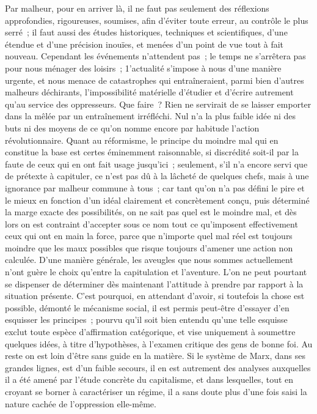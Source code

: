 \documentclass[french,twoside]{book} %
\begin{document}
Par malheur, pour en arriver là, il ne faut pas seulement des réflexions approfondies, rigoureuses, soumises, afin d'éviter toute erreur, au contrôle le plus serré ; il faut aussi des études historiques, techniques et scientifiques, d'une étendue et d'une précision inouïes, et menées d'un point de vue tout à fait nouveau. Cependant les événements n'attendent pas ; le temps ne s'arrêtera pas pour nous ménager des loisirs ; 1'actualité s'impose à nous d'une manière urgente, et nous menace de catastrophes qui entraîneraient, parmi bien d'autres malheurs déchirants, l'impossibilité matérielle d'étudier et d'écrire autrement qu'au service des oppresseurs. Que faire ? Rien ne servirait de se laisser emporter dans la mêlée par un entraînement irréfléchi. Nul n'a la plus faible idée ni des buts ni des moyens de ce qu'on nomme encore par habitude l'action révolutionnaire. Quant au réformisme, le principe du moindre mal qui en constitue la base est certes éminemment raisonnable, si discrédité soit-il par la faute de ceux qui en ont fait usage jusqu'ici ; seulement, s'il n'a encore servi que de prétexte à capituler, ce n'est pas dû à la lâcheté de quelques chefs, mais à une ignorance par malheur commune à tous ; car tant qu'on n'a pas défini le pire et le mieux en fonction d'un idéal clairement et concrètement conçu, puis déterminé la marge exacte des possibilités, on ne sait pas quel est le moindre mal, et dès lors on est contraint d'accepter sous ce nom tout ce qu'imposent effectivement ceux qui ont en main la force, parce que n'importe quel mal réel est toujours moindre que les maux possibles que risque toujours d'amener une action non calculée. D'une manière générale, les aveugles que nous sommes actuellement n'ont guère le choix qu'entre la capitulation et l'aventure. L'on ne peut pourtant se dispenser de déterminer dès maintenant l'attitude à prendre par rapport à la situation présente. C'est pourquoi, en attendant d'avoir, si toutefois la chose est possible, démonté le mécanisme social, il est permis peut-être d'essayer d'en esquisser les principes ; pourvu qu'il soit bien entendu qu'une telle esquisse exclut toute espèce d'affirmation catégorique, et vise uniquement à soumettre quelques idées, à titre d'hypothèses, à l'examen critique des gens de bonne foi. Au reste on est loin d'être sans guide en la matière. Si le système de Marx, dans ses grandes lignes, est d'un faible secours, il en est autrement des analyses auxquelles il a été amené par l'étude concrète du capitalisme, et dans lesquelles, tout en croyant se borner à caractériser un régime, il a sans doute plus d'une fois saisi la nature cachée de l'oppression elle-même.\par
\end{document}
